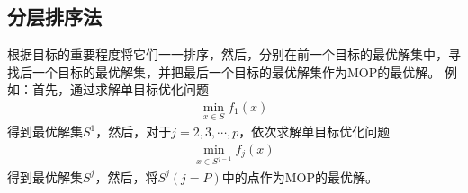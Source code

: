     \subsection{分层排序法}
        \par
        根据目标的重要程度将它们一一排序，然后，分别在前一个目标的最优解集中，寻找后一个目标的最优解集，并把最后一个目标的最优解集作为MOP的最优解。
        例如：首先，通过求解单目标优化问题
        \begin{align*}
           \mathop{\min}\limits_{x\in S} f_1(x)
        \end{align*}
        得到最优解集$S^1$，然后，对于$j=2,3,\cdots,p$，依次求解单目标优化问题
        \begin{align*}
           \mathop{\min}\limits_{x\in S^{j-1}} f_j(x)
        \end{align*}
        得到最优解集$S^j$，然后，将$S^j(j=P)$中的点作为MOP的最优解。
